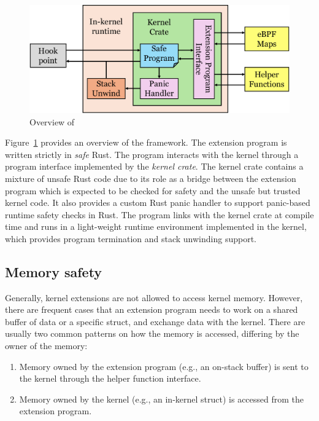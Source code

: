 \begin{figure}
    \includegraphics[width=1.0\linewidth]{figs/overview.pdf}
    \centering
    \vspace{-10pt}
    \caption{Overview of \projname{}}
    \label{fig:rex-overview}
    \vspace{-10pt}
\end{figure}

Figure~\ref{fig:rex-overview} provides an overview of the \projname{} framework.
The extension program is written strictly in \emph{safe} Rust.
The program interacts with the kernel through a program interface implemented
    by the \projname{} \emph{kernel crate}.
The kernel crate contains a mixture of unsafe Rust code due to its role as a
    bridge between the extension program which is expected to be checked for
    safety and the unsafe but trusted kernel code.
It also provides a custom Rust panic handler to support panic-based runtime
    safety checks in Rust.
The program links with the kernel crate at compile time and runs in a
    light-weight runtime environment implemented in the kernel, which provides
    program termination and stack unwinding support.

\subsection{Memory safety}
\label{principle:memsafety}
Generally, kernel extensions are not allowed to access kernel memory.
However, there are frequent cases that an extension program needs to work on a
    shared buffer of data or a specific struct, and exchange data with the
    kernel.
There are usually two common patterns on how the memory is accessed, differing
    by the owner of the memory:
\begin{enumerate}
    \item Memory owned by the extension program (e.g., an on-stack buffer)
        is sent to the kernel through the helper function interface.
    \item Memory owned by the kernel (e.g., an in-kernel struct) is
        accessed from the extension program. %
\end{enumerate}

